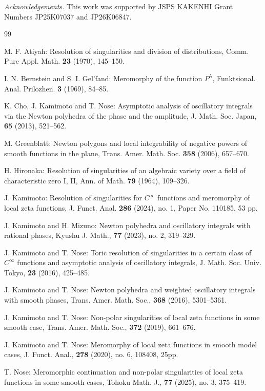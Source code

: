 \documentclass[12pt]{amsart}
\numberwithin{equation}{section}
\theoremstyle{definition}
\theoremstyle{remark}
\newcommand{\1}{{\bf 1}}
\begin{document}
\medskip 

{\it Acknowledgements.} 
This work was supported by JSPS KAKENHI Grant Numbers JP25K07037 and JP26K06847.

\begin{thebibliography}{99}

%
M. F. Atiyah:
Resolution of singularities and division of distributions, 
Comm. Pure Appl. Math. {\bf 23} (1970), 145--150. 


I. N. Bernstein and S. I. Gel'fand:
Meromorphy of the function $P^{\lambda}$,  
Funktsional. Anal.  Prilozhen. {\bf 3} (1969), 
84--85. 




K. Cho, J. Kamimoto and T. Nose:
Asymptotic analysis of oscillatory integrals via the Newton polyhedra of
the phase and the amplitude, 
J. Math. Soc. Japan,
{\bf 65} (2013), 521--562. 






M. Greenblatt: 
Newton polygons and local integrability of 
negative powers of smooth functions in the plane, 
Trans. Amer. Math. Soc.  {\bf 358}  (2006),  657--670. 

H. Hironaka: 
   Resolution of singularities of an algebraic variety 
   over a field of characteristic zero I, II, Ann. of Math. 
   {\bf 79} (1964), 109--326. 

J. Kamimoto:
Resolution of singularities 
for $C^{\infty}$ functions and 
meromorphy of local zeta functions, 
J. Funct. Anal. {\bf 286} (2024), no. 1, 
Paper No. 110185, 
53 pp.

J. Kamimoto and H. Mizuno:
Newton polyhedra and oscillatory integrals
with rational phases, Kyushu J. Math., 
{\bf 77} (2023), no. 2, 319--329.

J. Kamimoto and T. Nose:
Toric resolution of singularities in a certain class 
of $C^{\infty}$ functions and asymptotic analysis of 
oscillatory integrals, 
J. Math. Soc. Univ. Tokyo, {\bf 23} (2016), 425--485.

J. Kamimoto and T. Nose:
Newton polyhedra and weighted oscillatory integrals
with smooth phases, 
Trans. Amer. Math. Soc., {\bf 368} (2016), 5301--5361.

J. Kamimoto and T. Nose:
Non-polar singularities of local zeta functions
in some smooth case,
Trans. Amer. Math. Soc., {\bf 372}  (2019),  661--676.

J. Kamimoto and T. Nose:
Meromorphy of local zeta functions in smooth model cases,
J. Funct. Anal., {\bf 278} (2020), no. 6, 108408, 25pp.


T. Nose:
Meromorphic continuation and non-polar singularities of local zeta functions in some smooth cases,
Tohoku Math. J., {\bf 77} (2025), no. 3, 375--419.




\end{thebibliography}
\end{document}
